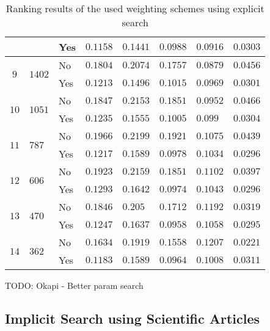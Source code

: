 \begin{table}[b]
\begin{adjustwidth}{-2cm}{}
\begin{tabular}{ c C{1.5cm} C{2.1cm} C{2.1cm} C{2.1cm} C{2.1cm} C{2.1cm} C{2.1cm} }
                                                    && Yes & $0.1158$ & $0.1441$ & $0.0988$ & $0.0916$ & $0.0303$  \\ \midrule
       &  & No  & $0.1804$ & $0.2074$ & $0.1757$ & $0.0879$ & $0.0456$  \\
                                                    && Yes & $0.1213$ & $0.1496$ & $0.1015$ & $0.0969$ & $0.0301$  \\ \midrule
       &  & No & $0.1847$ & $0.2153$ & $0.1851$ & $0.0952$ & $0.0466$  \\
                                                    && Yes & $0.1235$ & $0.1555$ & $0.1005$ & $0.099$  & $0.0304$  \\ \midrule
       &  & No  & $0.1966$ & $0.2199$ & $0.1921$ & $0.1075$ & $0.0439$  \\
                                                    && Yes & $0.1217$ & $0.1589$ & $0.0978$ & $0.1034$ & $0.0296$  \\ \midrule
       &  & No  & $0.1923$ & $0.2159$ & $0.1851$ & $0.1102$ & $0.0397$  \\
                                                    && Yes & $0.1293$ & $0.1642$ & $0.0974$ & $0.1043$ & $0.0296$  \\ \midrule
       &  & No  & $0.1846$ & $0.205$ & $0.1712$ & $0.1192$ & $0.0319$   \\
                                                    && Yes & $0.1247$ & $0.1637$ & $0.0958$ & $0.1058$ & $0.0295$  \\ \midrule
       &  & No  & $0.1634$ & $0.1919$ & $0.1558$ & $0.1207$ & $0.0221$  \\
                                                    && Yes & $0.1183$ & $0.1589$ & $0.0964$ & $0.1008$ & $0.0311$  \\
      \bottomrule
    \end{tabular}
  \caption[Ranking results with explicit search]{Ranking results of the used weighting schemes using explicit search}
  \label{tbl:ranking_result_explicit}
  \end{adjustwidth}
\end{table}

TODO: Okapi - Better param search

\subsection{Implicit Search using Scientific Articles}

